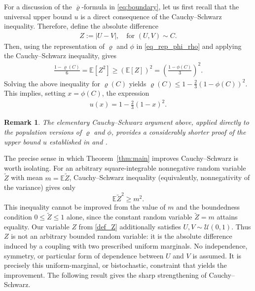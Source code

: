 \documentclass{article}
\newtheorem{remark}[theorem]{Remark}
\newcommand{\brho}{\overline\varrho}
\newcommand{\E}{\mathbb{E}}
\newcommand{\cU}{\mathcal{U}}
\begin{document}
For a discussion of the \(\brho\)-formula in \eqref{eq:boundary}, let us first recall that the universal upper bound \(u\) is a direct consequence of the Cauchy--Schwarz inequality.
Therefore, define the absolute difference
\begin{align}\label{def_Z}
    Z:= |U - V|,\quad \text{for } (U,V)\sim C.
\end{align}
Then, using the representation of \(\varrho\) and \(\phi\) in \eqref{eq_rep_phi_rho} and applying the Cauchy--Schwarz inequality, gives
\begin{align}\label{eq_CS}
   \frac{1-\varrho(C)}{6}
   = \E[Z^2]
   \geq \left(\E[Z]\right)^2
   = \left(\frac{1-\phi(C)}{3}\right)^2.
\end{align}
Solving the above inequality for \(\varrho(C)\) yields \(\varrho(C) \leq 1 - \frac 2 3 (1-\phi(C))^2\).
This implies, setting \(x = \phi(C)\), the expression
\begin{align}
    u(x) = 1 - \frac 2 3 (1-x)^2.
\end{align}
\begin{remark}
    The elementary Cauchy--Schwarz argument above, applied directly to the population versions of \(\varrho\) and \(\phi\), provides a considerably shorter proof of the upper bound \(u\) established in \cite[Theorem 11]{kokolbukovsek2024exact} and \cite[Theorem 3.4]{tschimpke2025revisiting}.
\end{remark}

The precise sense in which Theorem~\ref{thm:main} improves Cauchy--Schwarz is worth isolating.
For an arbitrary square-integrable nonnegative random variable \(\widetilde Z\) with mean \(m=\E\widetilde Z\), Cauchy--Schwarz inequality (equivalently, nonnegativity of the variance) gives only
\[
    \E\widetilde Z^2\geq m^2.
\]
This inequality cannot be improved from the value of \(m\) and the boundedness condition \(0\leq\widetilde Z\leq1\) alone, since the constant random variable \(\widetilde Z=m\) attains equality.
Our variable \(Z\) from \eqref{def_Z} additionally satisfies \(U,V\sim\cU(0,1)\).
Thus \(Z\) is not an arbitrary bounded random variable: it is the absolute difference induced by a coupling with two prescribed uniform marginals.
No independence, symmetry, or particular form of dependence between \(U\) and \(V\) is assumed.
It is precisely this uniform-marginal, or bistochastic, constraint that yields the improvement.
The following result gives the sharp strengthening of Cauchy--Schwarz.
\end{document}
